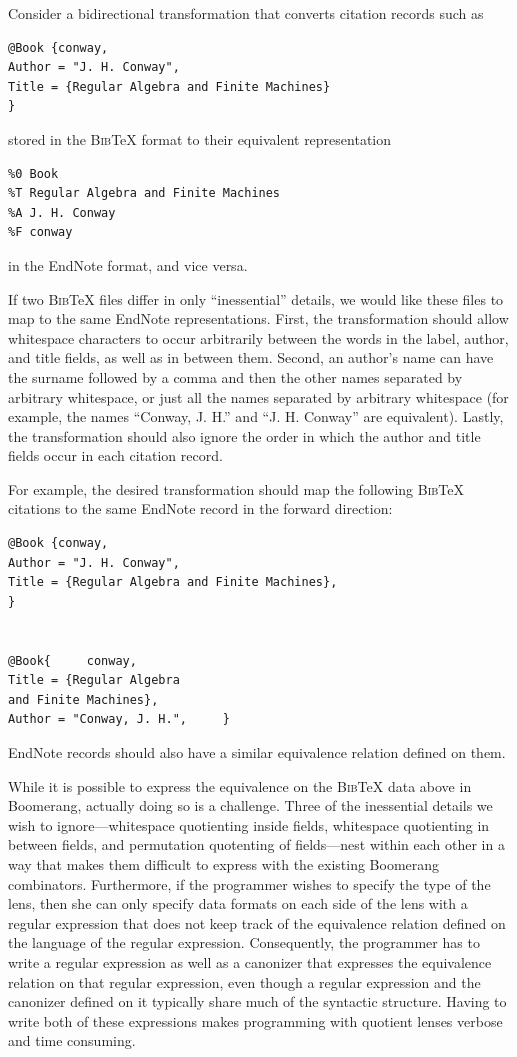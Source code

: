 \documentclass[acmsmall,review,anonymous]{acmart}\settopmatter{printfolios=true,printccs=false,printacmref=false}
\newcommand{\bibtex}{\textsc{Bib}\TeX{}}
\begin{document}
Consider a bidirectional transformation that converts citation records such as
\begin{verbatim}
@Book {conway,
Author = "J. H. Conway",
Title = {Regular Algebra and Finite Machines}
}
\end{verbatim}

\noindent stored in the \bibtex{} format to their equivalent representation
\begin{verbatim}
%0 Book
%T Regular Algebra and Finite Machines
%A J. H. Conway
%F conway
\end{verbatim}

\noindent in the EndNote format, and vice versa.

If two \bibtex{} files differ in only ``inessential'' details, we would like
these files to map to the same EndNote representations.
First, the transformation should allow whitespace characters to occur
arbitrarily between the words in the label, author, and title fields, as well as
in between them. Second, an author's name can have the surname followed by a
comma and then the other names separated by arbitrary whitespace, or just all
the names separated by arbitrary whitespace (for example, the names ``Conway, J.
H.'' and ``J. H. Conway'' are equivalent). Lastly, the transformation should
also ignore the order in which the author and title fields occur in each
citation record.

For example, the desired transformation should map the following
\bibtex{} citations to the same EndNote record in the forward direction:
\begin{verbatim}
@Book {conway,
Author = "J. H. Conway",
Title = {Regular Algebra and Finite Machines},
}


@Book{     conway,
Title = {Regular Algebra
and Finite Machines},
Author = "Conway, J. H.",     }
\end{verbatim}
\noindent EndNote records should also have a similar equivalence relation
defined on them.

While it is possible to express the equivalence on the \bibtex{} data above in
Boomerang, actually doing so is a challenge.  Three of the inessential details
we wish to ignore---whitespace quotienting
inside fields, whitespace quotienting in between fields, and permutation
quotenting of fields---nest within each other in a way that makes them difficult
to express with the existing Boomerang combinators. Furthermore, if the
programmer wishes to specify the type of the lens, then she can only specify
data formats on each side of the lens with a regular expression that does not
keep track of the equivalence relation defined on the language of the regular
expression. Consequently, the programmer has to write a regular expression as
well as a canonizer that expresses the equivalence relation on that regular
expression, even though a regular expression and the canonizer defined on it
typically share much of the syntactic structure. Having to write both of these
expressions makes programming with quotient lenses verbose and time consuming.
\end{document}

